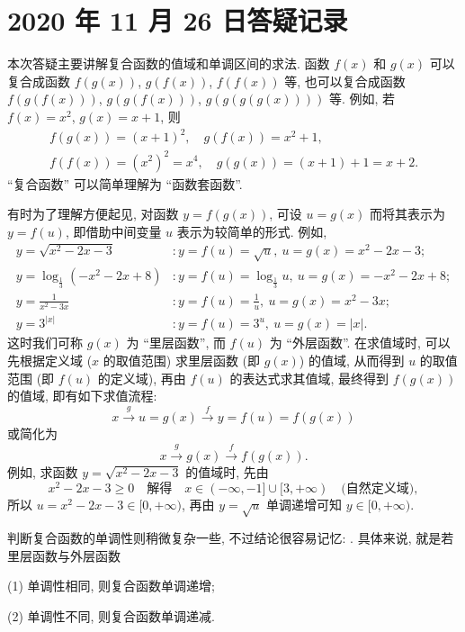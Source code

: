 \section{2020 年 11 月 26 日答疑记录}

本次答疑主要讲解复合函数的值域和单调区间的求法. 函数 $f(x)$ 和 $g(x)$ 可以复合成函数 $f(g(x))$, $g(f(x))$, $f(f(x))$ 等, 也可以复合成函数 $f(g(f(x)))$, $g(g(f(x)))$, $g(g(g(g(x))))$ 
等. 例如, 若 $f(x)=x^2$, $g(x)=x+1$, 则
\[\begin{gathered}
    f(g(x))= (x+1)^2,\quad g(f(x))= x^2+1,\\
        f(f(x))= (x^2)^2= x^4,\quad g(g(x))= (x+1)+1= x+2.
\end{gathered}\]
``复合函数'' 可以简单理解为 ``函数套函数''. 

有时为了理解方便起见, 对函数 $y=f(g(x))$, 可设 $u=g(x)$ 而将其表示为 $y=f(u)$, 即借助中间变量 $u$ 表示为较简单的形式. 例如,
\[\begin{aligned}
    y=\sqrt{x^2-2x-3}&\colon y=f(u)=\sqrt{u},\ u=g(x)= x^2-2x-3;\\
    y=\log_{\frac13} (-x^2-2x+8)&\colon y=f(u)=\log_{\frac13}{u},\ u=g(x)= -x^2-2x+8;\\
    y=\frac1{x^2-3x}&\colon y=f(u)=\frac1{u},\ u=g(x)= x^2-3x;\\
    y=3^{|x|}&\colon y=f(u)=3^{u},\ u=g(x)= |x|.
\end{aligned}\]
这时我们可称 $g(x)$ 为 ``里层函数'', 而 $f(u)$ 为 ``外层函数''. 在求值域时, 可以先根据定义域 ($x$ 的取值范围) 求里层函数 (即 $g(x)$) 的值域, 从而得到 $u$ 的取值范围 (即 $f(u)$ 的定义域), 再由 $f(u)$ 的表达式求其值域, 最终得到 $f(g(x))$ 的值域, 即有如下求值流程:
\[x\xrightarrow{\ g\ } u=g(x)\xrightarrow{\ f\ } y=f(u)= f(g(x))\]
或简化为
\[x\xrightarrow{\ g\ } g(x)\xrightarrow{\ f\ } f(g(x)).\]
例如, 求函数 $y=\sqrt{x^2-2x-3}$ 的值域时, 先由 
\[x^2-2x-3\geqslant 0\quad\text{解得}\quad x\in(-\infty,-1]\cup[3,+\infty)\quad \text{(自然定义域)},\]
所以 $u=x^2-2x-3\in[0,+\infty)$, 再由 $y=\sqrt{u}$ 单调递增可知 $y\in[0,+\infty)$.

判断复合函数的单调性则稍微复杂一些, 不过结论很容易记忆: . 具体来说, 就是若里层函数与外层函数

(1) 单调性相同, 则复合函数单调递增; 

(2) 单调性不同, 则复合函数单调递减. 

